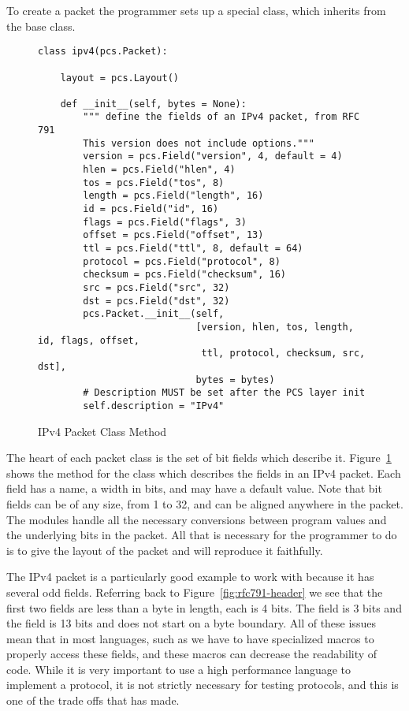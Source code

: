 \documentclass[11pt]{article}
\begin{document}
To create a packet the programmer sets up a special class, which
inherits from the  base class.  

\begin{figure}
  \centering
\begin{verbatim}
class ipv4(pcs.Packet):

    layout = pcs.Layout()

    def __init__(self, bytes = None):
        """ define the fields of an IPv4 packet, from RFC 791
        This version does not include options."""
        version = pcs.Field("version", 4, default = 4)
        hlen = pcs.Field("hlen", 4)
        tos = pcs.Field("tos", 8)
        length = pcs.Field("length", 16)
        id = pcs.Field("id", 16)
        flags = pcs.Field("flags", 3)
        offset = pcs.Field("offset", 13)
        ttl = pcs.Field("ttl", 8, default = 64)
        protocol = pcs.Field("protocol", 8)
        checksum = pcs.Field("checksum", 16)
        src = pcs.Field("src", 32)
        dst = pcs.Field("dst", 32)
        pcs.Packet.__init__(self,
                            [version, hlen, tos, length, id, flags, offset,
                             ttl, protocol, checksum, src, dst],
                            bytes = bytes)
        # Description MUST be set after the PCS layer init
        self.description = "IPv4"
\end{verbatim}
  \caption{IPv4 Packet Class  Method}
  \label{fig:ipv4-packet-init-method}
\end{figure}

The heart of each packet class is the set of bit fields which describe
it.  Figure~\ref{fig:ipv4-packet-init-method} shows the
 method for the  class which
describes the fields in an IPv4 packet.  Each field has a name, a
width in bits, and may have a default value.  Note that bit fields can
be of any size, from 1 to 32, and can be aligned anywhere in the
packet.  The  modules handle all the necessary
conversions between program values and the underlying bits in the
packet.  All that is necessary for the programmer to do is to give the
layout of the packet and  will reproduce it faithfully.

The IPv4 packet is a particularly good example to work with because it
has several odd fields.  Referring back to
Figure~\ref{fig:rfc791-header} we see that the first two fields are less
than a byte in length, each is 4 bits.  The  field is 3
bits and the  field is 13 bits and does not start on a
byte boundary.  All of these issues mean that in most languages, such
as  we have to have specialized macros to properly access
these fields, and these macros can decrease the readability of code.
While it is very important to use a high performance language to
implement a protocol, it is not strictly necessary for testing
protocols, and this is one of the trade offs that  has
made.
\end{document}
